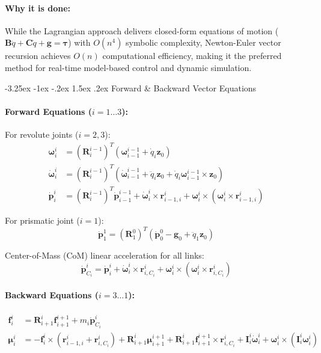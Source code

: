 \documentclass[11pt, a4paper]{article}
\makeatletter
\renewcommand{\subsection}{\@startsection{subsection}{2}{\z@}%
    {-3.25ex \@plus -1ex \@minus -.2ex}%
    {1.5ex \@plus .2ex}%
    {\normalfont\large\bfseries\color{brandaccent}}}
\makeatother
\begin{document}
\paragraph{Why it is done:}
While the Lagrangian approach delivers closed-form equations of motion ($\mathbf{B}\ddot{q} + \mathbf{C}\dot{q} + \mathbf{g} = \boldsymbol{\tau}$) with $O(n^4)$ symbolic complexity, Newton-Euler vector recursion achieves $O(n)$ computational efficiency, making it the preferred method for real-time model-based control and dynamic simulation.

\subsection{Forward \& Backward Vector Equations}
\paragraph{Forward Equations ($i = 1 \dots 3$):}
For revolute joints ($i = 2, 3$):
\begin{align}
    \boldsymbol{\omega}_i^i &= (\mathbf{R}_i^{i-1})^T (\boldsymbol{\omega}_{i-1}^{i-1} + \dot{q}_i \mathbf{z}_0) \\
    \dot{\boldsymbol{\omega}}_i^i &= (\mathbf{R}_i^{i-1})^T (\dot{\boldsymbol{\omega}}_{i-1}^{i-1} + \ddot{q}_i \mathbf{z}_0 + \dot{q}_i \boldsymbol{\omega}_{i-1}^{i-1} \times \mathbf{z}_0) \\
    \dot{\mathbf{p}}_i^i &= (\mathbf{R}_i^{i-1})^T \dot{\mathbf{p}}_{i-1}^{i-1} + \dot{\boldsymbol{\omega}}_i^i \times \mathbf{r}_{i-1,i}^i + \boldsymbol{\omega}_i^i \times (\boldsymbol{\omega}_i^i \times \mathbf{r}_{i-1,i}^i)
\end{align}

For prismatic joint ($i = 1$):
\begin{equation}
    \dot{\mathbf{p}}_1^1 = (\mathbf{R}_1^0)^T (\dot{\mathbf{p}}_0^0 - \mathbf{g}_0 + \ddot{q}_1 \mathbf{z}_0)
\end{equation}

Center-of-Mass (CoM) linear acceleration for all links:
\begin{equation}
    \dot{\mathbf{p}}_{C_i}^i = \dot{\mathbf{p}}_i^i + \dot{\boldsymbol{\omega}}_i^i \times \mathbf{r}_{i,C_i}^i + \boldsymbol{\omega}_i^i \times (\boldsymbol{\omega}_i^i \times \mathbf{r}_{i,C_i}^i)
\end{equation}

\paragraph{Backward Equations ($i = 3 \dots 1$):}
\begin{align}
    \mathbf{f}_i^i &= \mathbf{R}_{i+1}^i \mathbf{f}_{i+1}^{i+1} + m_i \dot{\mathbf{p}}_{C_i}^i \\
    \boldsymbol{\mu}_i^i &= -\mathbf{f}_i^i \times (\mathbf{r}_{i-1,i}^i + \mathbf{r}_{i,C_i}^i) + \mathbf{R}_{i+1}^i \boldsymbol{\mu}_{i+1}^{i+1} + \mathbf{R}_{i+1}^i \mathbf{f}_{i+1}^{i+1} \times \mathbf{r}_{i,C_i}^i + \mathbf{I}_i^i \dot{\boldsymbol{\omega}}_i^i + \boldsymbol{\omega}_i^i \times (\mathbf{I}_i^i \boldsymbol{\omega}_i^i)
\end{align}
\end{document}
